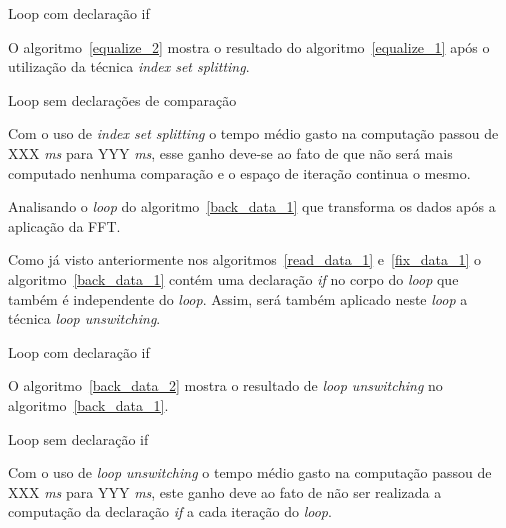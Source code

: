 \begin{algorithm}
\caption{Loop com declaração if }
\label{equalize_1}

\end{algorithm}

O algoritmo~\ref{equalize_2} mostra o resultado do algoritmo~\ref{equalize_1}
após o utilização da técnica \textit{index set splitting}.

\begin{algorithm}
\caption{Loop sem declarações de comparação}
\label{equalize_2}

\end{algorithm}

Com o uso de \textit{index set splitting} o tempo médio gasto na computação
passou de XXX \textit{ms} para YYY \textit{ms}, esse ganho deve-se ao fato de
que não será mais computado nenhuma comparação e o espaço de iteração continua o
mesmo.


Analisando o \textit{loop} do algoritmo~\ref{back_data_1} que transforma os 
dados após a aplicação da FFT.

Como já visto anteriormente nos algoritmos~\ref{read_data_1} e~\ref{fix_data_1}
o algoritmo~\ref{back_data_1} contém uma declaração \textit{if} no corpo do
\textit{loop} que também é independente do \textit{loop}. Assim, será também
aplicado neste \textit{loop} a técnica \textit{loop unswitching}.

\begin{algorithm}
\caption{Loop com declaração if }
\label{back_data_1}

\end{algorithm}

O algoritmo~\ref{back_data_2} mostra o resultado de \textit{loop unswitching} no
algoritmo~\ref{back_data_1}.

\begin{algorithm}
\caption{Loop sem declaração if }
\label{back_data_2}

\end{algorithm}

Com o uso de \textit{loop unswitching} o tempo médio gasto na computação passou
de XXX \textit{ms} para YYY \textit{ms}, este ganho deve ao fato de não ser
realizada a computação da declaração \textit{if} a cada iteração do
\textit{loop}.



